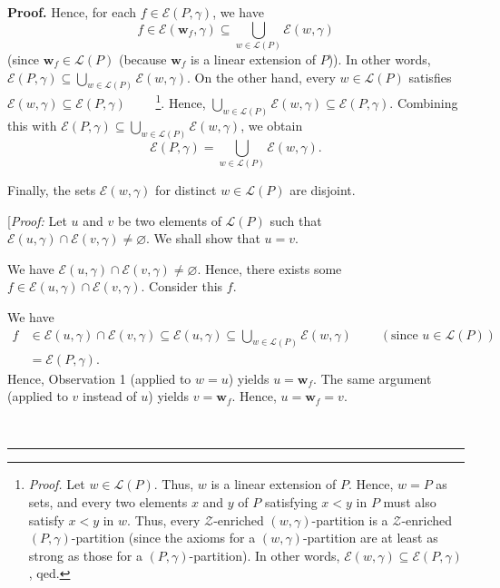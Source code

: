 \documentclass[numbers=enddot,12pt,final,onecolumn,notitlepage]{scrartcl}%
\theoremstyle{definition}
\newenvironment{proof}[1][Proof]{\noindent\textbf{#1.} }{\ \rule{0.5em}{0.5em}}
\newenvironment{verlong}{}{}
\begin{document}
\begin{verlong}
\begin{proof}
Hence, for each $f\in\mathcal{E}\left(  P,\gamma\right)  $, we have%
\[
f\in\mathcal{E}\left(  \mathbf{w}_{f},\gamma\right)  \subseteq\bigcup
_{w\in\mathcal{L}\left(  P\right)  }\mathcal{E}\left(  w,\gamma\right)
\]
(since $\mathbf{w}_{f}\in\mathcal{L}\left(  P\right)  $ (because
$\mathbf{w}_{f}$ is a linear extension of $P$)). In other words,
$\mathcal{E}\left(  P,\gamma\right)  \subseteq\bigcup_{w\in\mathcal{L}\left(
P\right)  }\mathcal{E}\left(  w,\gamma\right)  $. On the other hand, every
$w\in\mathcal{L}\left(  P\right)  $ satisfies $\mathcal{E}\left(
w,\gamma\right)  \subseteq\mathcal{E}\left(  P,\gamma\right)  $%
\ \ \ \ \footnote{\textit{Proof.} Let $w\in\mathcal{L}\left(  P\right)  $.
Thus, $w$ is a linear extension of $P$. Hence, $w = P$ as sets, and every
two elements $x$ and $y$ of $P$ satisfying $x < y$ in $P$ must also
satisfy $x < y$ in $w$.
Thus, every $\mathcal{Z}$-enriched
$\left(  w,\gamma\right)  $-partition is a $\mathcal{Z}$-enriched $\left(
P,\gamma\right)  $-partition (since the axioms for a $\left(  w,\gamma\right)
$-partition are at least as strong as those for a $\left(  P,\gamma\right)
$-partition). In other words, $\mathcal{E}\left(  w,\gamma\right)
\subseteq\mathcal{E}\left(  P,\gamma\right)  $, qed.}. Hence, $\bigcup
_{w\in\mathcal{L}\left(  P\right)  }\mathcal{E}\left(  w,\gamma\right)
\subseteq\mathcal{E}\left(  P,\gamma\right)  $. Combining this with
$\mathcal{E}\left(  P,\gamma\right)  \subseteq\bigcup_{w\in\mathcal{L}\left(
P\right)  }\mathcal{E}\left(  w,\gamma\right)  $, we obtain%
\begin{equation}
\mathcal{E}\left(  P,\gamma\right)  =\bigcup_{w\in\mathcal{L}\left(  P\right)
}\mathcal{E}\left(  w,\gamma\right)  .\label{pf.prop.fund-lem.union}%
\end{equation}


Finally, the sets $\mathcal{E}\left(  w,\gamma\right)  $ for distinct
$w\in\mathcal{L}\left(  P\right)  $ are disjoint.

[\textit{Proof:} Let $u$ and $v$ be two elements of $\mathcal{L}\left(
P\right)  $ such that $\mathcal{E}\left(  u,\gamma\right)  \cap\mathcal{E}%
\left(  v,\gamma\right)  \neq\varnothing$. We shall show that $u=v$.

We have $\mathcal{E}\left(  u,\gamma\right)  \cap\mathcal{E}\left(
v,\gamma\right)  \neq\varnothing$. Hence, there exists some $f\in
\mathcal{E}\left(  u,\gamma\right)  \cap\mathcal{E}\left(  v,\gamma\right)  $.
Consider this $f$.

We have%
\begin{align*}
f  & \in\mathcal{E}\left(  u,\gamma\right)  \cap\mathcal{E}\left(
v,\gamma\right)  \subseteq\mathcal{E}\left(  u,\gamma\right)  \subseteq
\bigcup_{w\in\mathcal{L}\left(  P\right)  }\mathcal{E}\left(  w,\gamma\right)
\ \ \ \ \ \ \ \ \ \ \left(  \text{since }u\in\mathcal{L}\left(  P\right)
\right)  \\
& =\mathcal{E}\left(  P,\gamma\right)  .
\end{align*}
Hence, Observation 1 (applied to $w=u$) yields $u=\mathbf{w}_{f}$. The same
argument (applied to $v$ instead of $u$) yields $v=\mathbf{w}_{f}$. Hence,
$u=\mathbf{w}_{f}=v$.


\end{proof}
\end{verlong}
\end{document}
